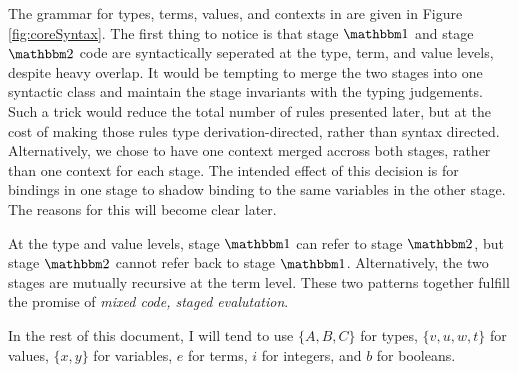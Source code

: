 \documentclass{article}
\begin{document}
The grammar for types, terms, values, and contexts in \corelang are given in Figure \ref{fig:coreSyntax}.  The first thing to notice is that stage $\bbone$ and stage $\bbtwo$ code are syntactically seperated at the type, term, and value levels, despite heavy overlap.  It would be tempting to merge the two stages into one syntactic class and maintain the stage invariants with the typing judgements.  Such a trick would reduce the total number of rules presented later, but at the cost of making those rules type derivation-directed, rather than syntax directed.  Alternatively, we chose to have one context merged accross both stages, rather than one context for each stage.  The intended effect of this decision is for bindings in one stage to shadow binding to the same variables in the other stage.  The reasons for this will become clear later.

At the type and value levels, stage $\bbone$ can refer to stage $\bbtwo$, but stage $\bbtwo$ cannot refer back to stage $\bbone$.  Alternatively, the two stages are mutually recursive at the term level.  These two patterns together fulfill the promise of {\em mixed code, staged evalutation}.

In the rest of this document, I will tend to use $\{A,B,C\}$ for types, $\{v,u,w,t\}$ for values, $\{x,y\}$ for variables, $e$ for terms, $i$ for integers, and $b$ for booleans.
\end{document}
